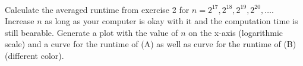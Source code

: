  \\
Calculate the averaged runtime from exercise 2 for
$n = 2^{17}, 2^{18}, 2^{19}, 2^{20}, \dots$.
Increase $n$ as long as your computer is okay with it and the computation
time is still bearable.
Generate a plot with the value of $n$ on the x-axis (logarithmic scale)
and a curve for the runtime of (A) as well as curve for the runtime of (B)
(different color).
